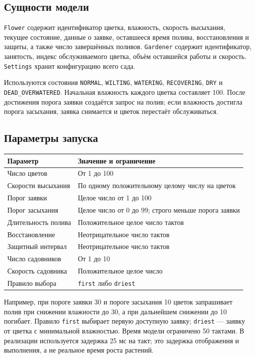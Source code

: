 \documentclass[12pt,a4paper]{article}
\begin{document}
\subsection{Сущности модели}
\texttt{Flower} содержит идентификатор цветка, влажность, скорость высыхания, текущее состояние, данные о заявке, оставшееся время полива, восстановления и защиты, а также число завершённых поливов. \texttt{Gardener} содержит идентификатор, занятость, индекс обслуживаемого цветка, объём оставшейся работы и скорость. \texttt{Settings} хранит конфигурацию всего сада.

Используются состояния \texttt{NORMAL}, \texttt{WILTING}, \texttt{WATERING}, \texttt{RECOVERING}, \texttt{DRY} и \texttt{DEAD\_OVERWATERED}. Начальная влажность каждого цветка составляет 100. После достижения порога заявки создаётся запрос на полив; если влажность достигла порога засыхания, заявка снимается и цветок перестаёт обслуживаться.

\subsection{Параметры запуска}
\begin{longtable}{|p{}|p{}|}
\hline
Параметр & Значение и ограничение\\ \hline
\endhead
Число цветов & От 1 до 100\\ \hline
Скорости высыхания & По одному положительному целому числу на цветок\\ \hline
Порог заявки & Целое число от 1 до 100\\ \hline
Порог засыхания & Целое число от 0 до 99; строго меньше порога заявки\\ \hline
Длительность полива & Положительное целое число тактов\\ \hline
Восстановление & Неотрицательное число тактов\\ \hline
Защитный интервал & Неотрицательное число тактов\\ \hline
Число садовников & От 1 до 10\\ \hline
Скорость садовника & Положительное целое число\\ \hline
Правило выбора & \texttt{first} либо \texttt{driest}\\ \hline
\end{longtable}

Например, при пороге заявки 30 и пороге засыхания 10 цветок запрашивает полив при снижении влажности до 30, а при дальнейшем снижении до 10 погибает. Правило \texttt{first} выбирает первую доступную заявку; \texttt{driest} --- заявку от цветка с минимальной влажностью. Время модели ограничено 50 тактами. В реализации используется задержка 25 мс на такт; это задержка отображения и выполнения, а не реальное время роста растений.
\end{document}
